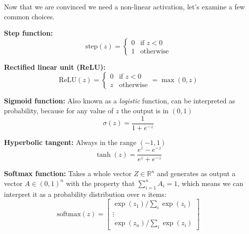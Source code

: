 \documentclass[11pt]{article}
\newcommand{\R}{\mathbb{R}}
\newcommand{\R}{\mathbb{R}}
\begin{document}
Now that we are convinced we need a non-linear activation, let's
examine a few common choices.
\begin{description}
  \item{\bf Step function:} 
    $$\text{step}(z) =
    \begin{cases}
      0 & \text{if $z<0$}\\
      1 & \text{otherwise}
    \end{cases}$$
  \item{\bf Rectified linear unit (ReLU):} 
    $$\text{ReLU}(z) =
    \begin{cases}
      0 & \text{if $z<0$}\\
      z & \text{otherwise}
    \end{cases} = \max(0,z)$$ 
  \item{\bf Sigmoid function:} Also known as a {\em logistic} function, can
    be interpreted as probability, because for any value of $z$ the
    output is in $(0, 1)$
    $$\sigma(z) = \frac{1}{1+e^{-z}}$$
  \item{\bf Hyperbolic tangent:} Always in the range $(-1, 1)$
 $$\tanh(z) = \frac{e^z - e^{-z}}{e^z + e^{-z}}$$
\item{\bf Softmax function:}
Takes a whole vector $Z \in \R^n$ and generates as output a vector
$A \in (0, 1)^n$ with the property that $\sum_{i = 1}^n A_i = 1$,
which means we can interpret it as a probability distribution over $n$ items:
\[\text{softmax}(z) =
  \begin{bmatrix}
    \exp(z_1) / \sum_{i} \exp(z_i) \\
    \vdots \\
    \exp(z_n) / \sum_{i} \exp(z_i)
\end{bmatrix}\]

\end{description}
\end{document}
